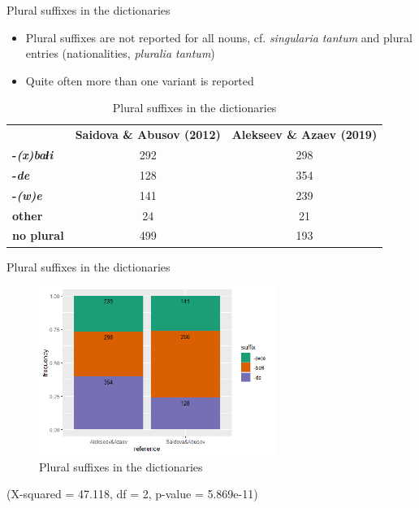 \begin{frame}{Plural suffixes in the dictionaries}
\begin{itemize}
    \item Plural suffixes are not reported for all nouns, cf. \textit{singularia tantum} and plural entries (nationalities, \textit{pluralia tantum})
    \item Quite often more than one variant is reported
\end{itemize}
\begin{table}[]
\caption{Plural suffixes in the dictionaries}
\centering
\begin{tabular}{lcc}
          & \multicolumn{1}{l}{\textbf{Saidova \& Abusov (2012)}} & \multicolumn{1}{l}{\textbf{Alekseev \& Azaev (2019)}} \\
\textbf{-\textit{(x)baɬi}}  & 292                                          & 298                                          \\
\textbf{-\textit{de}}       & 128                                          & 354                                          \\
\textbf{-\textit{(w)e}}     & 141                                          & 239                                          \\
\textbf{other}     & 24                                           & 21                                           \\
\textbf{no plural} & 499                                          & 193                                         
\end{tabular}
\end{table}
\end{frame}

\begin{frame}{Plural suffixes in the dictionaries}
\begin{figure}[h]
\caption{Plural suffixes in the dictionaries}
\centering
\includegraphics[height=5.5cm]{images/plural.png}
\end{figure}
\centering
\small (X-squared = 47.118, df = 2, p-value = 5.869e-11)
\end{frame}

